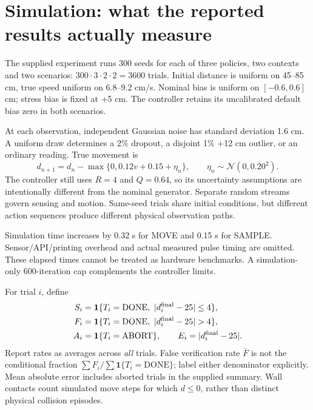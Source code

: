 \documentclass[11pt,a4paper]{article}
\newcommand{\N}{\mathcal N}
\begin{document}
\section{Simulation: what the reported results actually measure}
The supplied experiment runs 300 seeds for each of three policies, two contexts and two scenarios: $300\cdot3\cdot2\cdot2=3600$ trials. Initial distance is uniform on 45--85 cm, true speed uniform on 6.8--9.2 cm/s. Nominal bias is uniform on $[-0.6,0.6]$ cm; stress bias is fixed at +5 cm. The controller retains its uncalibrated default bias zero in both scenarios.

At each observation, independent Gaussian noise has standard deviation 1.6 cm. A uniform draw determines a 2\% dropout, a disjoint 1\% +12 cm outlier, or an ordinary reading. True movement is
\begin{equation}
 d_{n+1}=d_n-\max\{0,0.12v+0.15+\eta_n\},\qquad
 \eta_n\sim\N(0,0.20^2).
\end{equation}
The controller still uses $R=4$ and $Q=0.64$, so its uncertainty assumptions are intentionally different from the nominal generator. Separate random streams govern sensing and motion. Same-seed trials share initial conditions, but different action sequences produce different physical observation paths.

Simulation time increases by 0.32 s for MOVE and 0.15 s for SAMPLE. Sensor/API/printing overhead and actual measured pulse timing are omitted. These elapsed times cannot be treated as hardware benchmarks. A simulation-only 600-iteration cap complements the controller limits.

For trial $i$, define
\begin{align}
 S_i&=\mathbf1\{T_i=\mathrm{DONE},\ |d_i^{\rm final}-25|\leq4\},\\
 F_i&=\mathbf1\{T_i=\mathrm{DONE},\ |d_i^{\rm final}-25|>4\},\\
 A_i&=\mathbf1\{T_i=\mathrm{ABORT}\},\qquad
 E_i=|d_i^{\rm final}-25|.
\end{align}
Report rates as averages across \emph{all} trials. False verification rate $\bar F$ is not the conditional fraction $\sum F_i/\sum\mathbf1\{T_i=\mathrm{DONE}\}$; label either denominator explicitly. Mean absolute error includes aborted trials in the supplied summary. Wall contacts count simulated move steps for which $d\leq0$, rather than distinct physical collision episodes.
\end{document}
